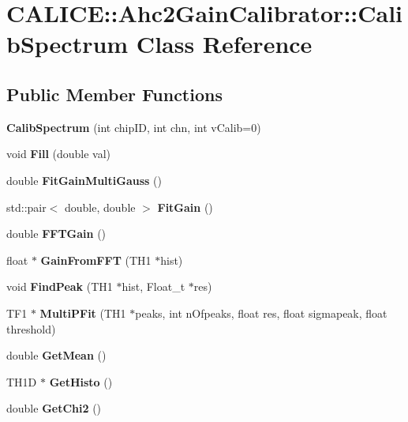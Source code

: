 \section{CALICE::Ahc2GainCalibrator::CalibSpectrum Class Reference}
\label{classCALICE_1_1Ahc2GainCalibrator_1_1CalibSpectrum}
\subsection*{Public Member Functions}
\begin{DoxyCompactItemize}
\item 
{\bfseries CalibSpectrum} (int chipID, int chn, int vCalib=0)\label{classCALICE_1_1Ahc2GainCalibrator_1_1CalibSpectrum_a67bcd91dbc453e55bf4fc51483522eb6}

\item 
void {\bfseries Fill} (double val)\label{classCALICE_1_1Ahc2GainCalibrator_1_1CalibSpectrum_a536be2de9ee61d690c6c5485fd14fff6}

\item 
double {\bfseries FitGainMultiGauss} ()\label{classCALICE_1_1Ahc2GainCalibrator_1_1CalibSpectrum_a9f9f4f4130c2127e9680e825ed1a7feb}

\item 
std::pair$<$ double, double $>$ {\bfseries FitGain} ()\label{classCALICE_1_1Ahc2GainCalibrator_1_1CalibSpectrum_a53507513027b248d8166673d5d0bf74c}

\item 
double {\bfseries FFTGain} ()\label{classCALICE_1_1Ahc2GainCalibrator_1_1CalibSpectrum_a76e65e633998a415f97d64db18ecc39f}

\item 
float $\ast$ {\bfseries GainFromFFT} (TH1 $\ast$hist)\label{classCALICE_1_1Ahc2GainCalibrator_1_1CalibSpectrum_ac116ca191bf1c8e02c9c8d12875e863d}

\item 
void {\bfseries FindPeak} (TH1 $\ast$hist, Float\_\-t $\ast$res)\label{classCALICE_1_1Ahc2GainCalibrator_1_1CalibSpectrum_aa28872130c993591075712d06a08944a}

\item 
TF1 $\ast$ {\bfseries MultiPFit} (TH1 $\ast$peaks, int nOfpeaks, float res, float sigmapeak, float threshold)\label{classCALICE_1_1Ahc2GainCalibrator_1_1CalibSpectrum_aee99f1e523134b999bbca2992d19ff5f}

\item 
double {\bfseries GetMean} ()\label{classCALICE_1_1Ahc2GainCalibrator_1_1CalibSpectrum_aa30eff013ec90c1be01efa8ebc265fd6}

\item 
TH1D $\ast$ {\bfseries GetHisto} ()\label{classCALICE_1_1Ahc2GainCalibrator_1_1CalibSpectrum_af7e759c1725e0cf7e661c5c94145b602}

\item 
double {\bfseries GetChi2} ()\label{classCALICE_1_1Ahc2GainCalibrator_1_1CalibSpectrum_a93760f7593b9c2b61b76df12e331d2b9}

\end{DoxyCompactItemize}
